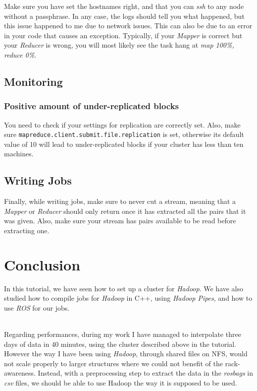 \documentclass[a4paper, 12pt]{article}
\begin{document}
Make sure you have set the hostnames right, and that you can \textit{ssh} to any node without a passphrase. In any case, the logs should tell you what happened, but this issue happened to me due to network issues. This can also be due to an error in your code that causes an exception. Typically, if your \textit{Mapper} is correct but your \textit{Reducer} is wrong, you will most likely see the task hang at \textit{map 100\%, reduce 0\%}.
    
  \subsection{Monitoring}
  
    \subsubsection*{Positive amount of under-replicated blocks}
    
You need to check if your settings for replication are correctly set. Also, make sure \texttt{mapreduce.client.submit.file.replication} is set, otherwise its default value of 10 will lead to under-replicated blocks if your cluster has less than ten machines.

  \subsection{Writing Jobs}

Finally, while writing jobs, make sure to never cut a stream, meaning that a \textit{Mapper} or \textit{Reducer} should only return once it has extracted all the pairs that it was given. Also, make sure your stream has pairs available to be read before extracting one.

\section{Conclusion}

In this tutorial, we have seen how to set up a cluster for \textit{Hadoop}. We have also studied how to compile jobs for \textit{Hadoop} in C++, using \textit{Hadoop Pipes}, and how to use \textit{ROS} for our jobs.

~\\
Regarding performances, during my work I have managed to interpolate three days of data in 40 minutes, using the cluster described above in the tutorial.  However the way I have been using \textit{Hadoop}, through shared files on NFS, would not scale properly to larger structures where we could not benefit of the rack-awareness. Instead, with a preprocessing step to extract the data in the \textit{rosbags} in \textit{csv} files, we should be able to use Hadoop the way it is supposed to be used.
\end{document}
